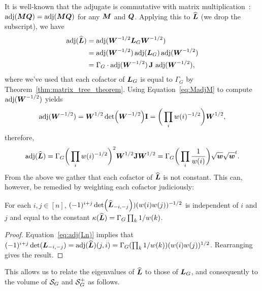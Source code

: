 It is well-known  that the adjugate is commutative with matrix multiplication~\cite{godsil2013algebraic}: $\operatorname{\textnormal{adj}}({\vb*{M}}\vb*{Q}) = \operatorname{\textnormal{adj}}({\vb*{M}}\vb*{Q})$ for any ${\vb*{M}}$ and  $\vb*{Q}$. Applying this  to $\widehat{\vb*{L}}$ (we drop the subscript), we have 
\begin{align*}
\operatorname{\textnormal{adj}}(\widehat{\vb*{L}}) &= \operatorname{\textnormal{adj}}(\vb*{W}^{-1/2}\vb*{L}_G\vb*{W}^{-1/2}) \\
&= \operatorname{\textnormal{adj}}(\vb*{W}^{-1/2})\operatorname{\textnormal{adj}}(\vb*{L}_G)\operatorname{\textnormal{adj}}(\vb*{W}^{-1/2}) \\
&= \Gamma_G \cdot \operatorname{\textnormal{adj}}(\vb*{W}^{-1/2})\,\vb{J}\,\operatorname{\textnormal{adj}}(\vb*{W}^{-1/2}),
\end{align*}
where we've used that each cofactor of $\vb*{L}_G$ is  equal  to  $\Gamma_G$ by  Theorem~\ref{thm:matrix_tree_theorem}. Using Equation~\eqref{eq:MadjM} to compute $\operatorname{\textnormal{adj}}(\vb*{W}^{-1/2})$ yields
\begin{align*}
\operatorname{\textnormal{adj}}(\vb*{W}^{-1/2}) = \vb*{W}^{1/2} \det(\vb*{W}^{-1/2}) \vb{I} = \bigg(\prod_i w(i)^{-1/2}\bigg) \vb*{W}^{1/2},
\end{align*}
therefore, 
\begin{align}
\operatorname{\textnormal{adj}}(\widehat{\vb*{L}})  = \Gamma_G \bigg(\prod_i w(i)^{-1/2}\bigg)^2 \vb*{W}^{1/2} \vb{J}\vb*{W}^{1/2}  = \Gamma_G \bigg(\prod_i \frac{1}{w(i)} \bigg) \sqrt{\vb*{w}}\sqrt{\vb*{w}}^t.
\label{eq:adj(Ln)}
\end{align}
From the above we gather that each cofactor of $\widehat{\vb*{L}}$  is not constant. This can, however, be remedied by weighting  each  cofactor judiciously: 

\begin{lemma}
	\label{lem:adjLn_constant}
	For each $i,j\in[n]$, $(-1)^{i+j}\det(\widehat{\vb*{L}}_{-i,-j}))(w(i)w(j))^{-1/2}$ is independent of $i$  and $j$  and equal to the  constant $\kappa(\widehat{\vb*{L}}) = \Gamma_G\prod_k 1/w(k)$. 
\end{lemma}
\begin{proof}
	Equation~\eqref{eq:adj(Ln)} implies that  $(-1)^{i+j}\det(\vb*{L}_{-i,-j})=\operatorname{\textnormal{adj}}(\widehat{\vb*{L}})(j,i) = \Gamma_G(\prod_k 1/w(k)) (w(i)w(j))^{1/2}$. Rearranging gives the result.  
\end{proof}


This allows us to relate the  eigenvalues of $\widehat{\vb*{L}}$ to those of $\vb*{L}_G$, and consequently to the volume of $\mathcal{S}_G$  and  $\mathcal{S}_G^+$  as  follows. 


